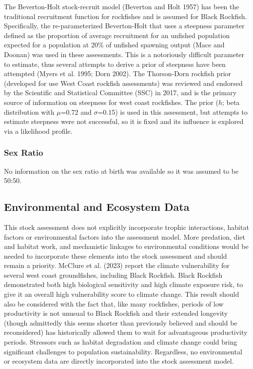\documentclass[11pt,
  english,
  letterpaper,
]{article}
\begin{document}
The Beverton-Holt stock-recruit model (Beverton and Holt 1957) has been the traditional recruitment function for rockfishes and is assumed for Black Rockfish. Specifically, the re-parameterized Beverton-Holt that uses a steepness parameter defined as the proportion of average recruitment for an unfished population expected for a population at 20\% of unfished spawning output (Mace and Doonan) was used in these assessments. This is a notoriously difficult parameter to estimate, thus several attempts to derive a prior of steepness have been attempted (Myers et al. 1995; Dorn 2002). The Thorson-Dorn rockfish prior (developed for use West Coast rockfish assessments) was reviewed and endorsed by the Scientific and Statistical Committee (SSC) in 2017, and is the primary source of information on steepness for west coast rockfishes. The prior (\(h\); beta distribution with \(\mu\)=0.72 and \(\sigma\)=0.15) is used in this assessment, but attempts to estimate steepness were not successful, so it is fixed and its influence is explored via a likelihood profile.

\hypertarget{sex-ratio}{%
\subsubsection{Sex Ratio}\label{sex-ratio}}

No information on the sex ratio at birth was available so it was assumed to be 50:50.

\hypertarget{environmental-and-ecosystem-data}{%
\subsection{Environmental and Ecosystem Data}\label{environmental-and-ecosystem-data}}

This stock assessment does not explicitly incorporate trophic interactions, habitat factors or environmental factors into the assessment model. More predation, diet and habitat work, and mechanistic linkages to environmental conditions would be needed to incorporate these elements into the stock assessment and should remain a priority. McClure et al. (2023) report the climate vulnerability for several west coast groundfishes, including Black Rockfish. Black Rockfish demonstrated both high biological sensitivity and high climate exposure risk, to give it an overall high vulnerability score to climate change. This result should also be considered with the fact that, like many rockfishes, periods of low productivity is not unusual to Black Rockfish and their extended longevity (though admittedly this seems shorter than previously believed and should be reconsidered) has historically allowed them to wait for advantageous productivity periods. Stressors such as habitat degradation and climate change could bring significant challenges to population sustainability. Regardless, no environmental or ecosystem data are directly incorporated into the stock assessment model.
\end{document}
